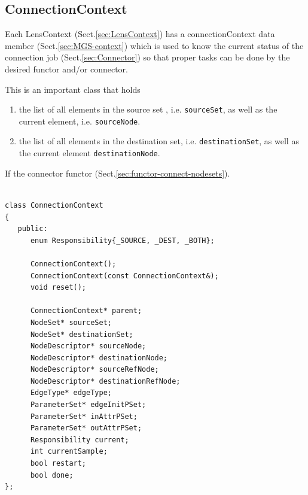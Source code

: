 \subsection{ConnectionContext}
\label{sec:ConnectionContext}

Each LensContext (Sect.\ref{sec:LensContext}) has a connectionContext data
member (Sect.\ref{sec:MGS-context}) which is used to know the current status of
the connection job (Sect.\ref{sec:Connector}) so that proper tasks can be done
by the desired functor and/or connector.

This is an important class that holds
\begin{enumerate}
  \item the list of all elements in the source set , i.e. \verb!sourceSet!, 
  as well as the current element, i.e. \verb!sourceNode!.
  
  \item the list of all elements in the destination set, i.e.
  \verb!destinationSet!, as well as the current element \verb!destinationNode!.
  
  
\end{enumerate}
If the connector functor (Sect.\ref{sec:functor-connect-nodesets}).

{\tiny
\begin{lstlisting}

class ConnectionContext
{
   public:
      enum Responsibility{_SOURCE, _DEST, _BOTH};

      ConnectionContext();
      ConnectionContext(const ConnectionContext&);
      void reset();

      ConnectionContext* parent;
      NodeSet* sourceSet;
      NodeSet* destinationSet;
      NodeDescriptor* sourceNode;
      NodeDescriptor* destinationNode;
      NodeDescriptor* sourceRefNode;
      NodeDescriptor* destinationRefNode;
      EdgeType* edgeType;
      ParameterSet* edgeInitPSet;
      ParameterSet* inAttrPSet;
      ParameterSet* outAttrPSet;
      Responsibility current;
      int currentSample;
      bool restart;
      bool done;
};
\end{lstlisting}
}

